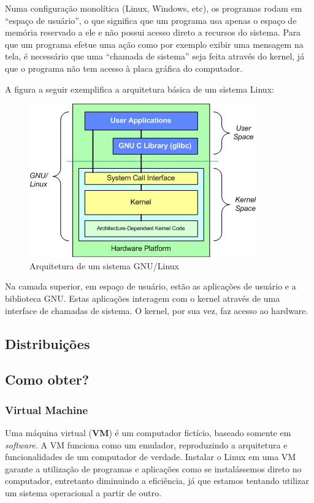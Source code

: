 \documentclass{handout_utfpr}
\begin{document}
Numa configuração monolítica (Linux, Windows, etc), os programas rodam em ``espaço de usuário'', o que significa que um programa usa apenas o espaço de memória reservado a ele e não possui acesso direto a recursos do sistema. Para que um programa efetue uma ação como por exemplo exibir uma mensagem na tela, é necessário que uma ``chamada de sistema'' seja feita através do kernel, já que o programa não tem acesso à placa gráfica do computador.

A figura a seguir exemplifica a arquitetura básica de um sistema Linux:
\begin{figure}[!h]
  \centering
  \includegraphics[scale=.8]{kernel.jpg}
  \caption{Arquitetura de um sistema GNU/Linux}
  \label{fig:kernel}
\end{figure}
Na camada superior, em espaço de usuário, estão as aplicações de usuário e a biblioteca GNU. Estas aplicações interagem com o kernel através de uma interface de chamadas de sistema. O kernel, por sua vez, faz acesso ao hardware.

\subsection{Distribuições}

\subsection{}


\subsection{Como obter?}

\subsubsection{Virtual Machine}
Uma máquina virtual (\textbf{VM}) é um computador fictício, baseado somente em \emph{software}. A VM funciona como um emulador, reproduzindo a arquitetura e funcionalidades de um computador de verdade.
Instalar o Linux em uma VM garante a utilização de programas e aplicações como se instalássemos direto no computador, entretanto diminuindo a eficiência, já que estamos tentando utilizar um sistema operacional a partir de outro.
\end{document}

